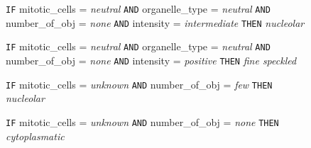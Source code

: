 \begin{figure}
\begin{algorithmic}[1]
			\State \texttt{IF} mitotic\_cells = \textit{neutral} \texttt{AND} organelle\_type = \textit{neutral} \texttt{AND} number\_of\_obj = \textit{none} \texttt{AND} intensity = \textit{intermediate}
			\Statex \texttt{THEN} \textit{nucleolar}
			
			\State \texttt{IF} mitotic\_cells = \textit{neutral} \texttt{AND} organelle\_type = \textit{neutral} \texttt{AND} number\_of\_obj = \textit{none} \texttt{AND} intensity = \textit{positive}
			\Statex \texttt{THEN} \textit{fine speckled}
			
			\State \texttt{IF} mitotic\_cells = \textit{unknown} \texttt{AND} number\_of\_obj = \textit{few} 
			\Statex \texttt{THEN} \textit{nucleolar}
			
			\State \texttt{IF} mitotic\_cells = \textit{unknown} \texttt{AND} number\_of\_obj = \textit{none} 
			\Statex \texttt{THEN} \textit{cytoplasmatic}
			
		\end{algorithmic}
\end{figure}


